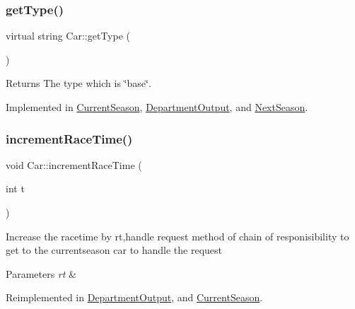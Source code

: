\subsubsection{\texorpdfstring{get\+Type()}{getType()}}
{\footnotesize\ttfamily virtual string Car\+::get\+Type (\begin{DoxyParamCaption}{ }\end{DoxyParamCaption})\hspace{0.3cm}{\ttfamily [pure virtual]}}

\begin{DoxyReturn}{Returns}
The type which is \char`\"{}base\char`\"{}. 
\end{DoxyReturn}


Implemented in \hyperlink{classCurrentSeason_abeb85d64969c9fd4945bf64ab0464ccd}{Current\+Season}, \hyperlink{classDepartmentOutput_a9366794b5b64ed37cf37ed6443eecf01}{Department\+Output}, and \hyperlink{classNextSeason_abe6df1f0b67eddbf990e9a92f6f68ff4}{Next\+Season}.

\mbox{\label{classCar_a3944276e317e680a756ac58e7bac6e6f}} 
\subsubsection{\texorpdfstring{increment\+Race\+Time()}{incrementRaceTime()}}
{\footnotesize\ttfamily void Car\+::increment\+Race\+Time (\begin{DoxyParamCaption}\item[{int}]{t }\end{DoxyParamCaption})\hspace{0.3cm}{\ttfamily [virtual]}}

Increase the racetime by rt,handle request method of chain of responisibility to get to the currentseason car to handle the request 
\begin{DoxyParams}{Parameters}
{\em rt} & \\
\hline
\end{DoxyParams}


Reimplemented in \hyperlink{classDepartmentOutput_a64f6b8afd2702b4d223c4cac0909b470}{Department\+Output}, and \hyperlink{classCurrentSeason_a58d31e4029253b1c244ee44f0052916f}{Current\+Season}.

\mbox{\label{classCar_a5859a9475be0c26341ca4f3acf23a2ea}} 
